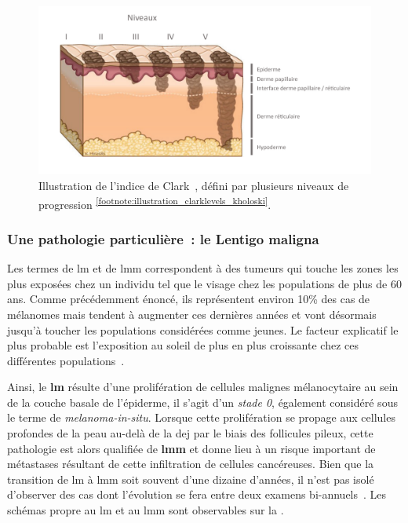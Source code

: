 \begin{figure}[H]
    \centering
    \includegraphics[width=0.9\linewidth]{contents/chapter_1/resources/illustration_clarklevels_kholoski.pdf}
    \caption{Illustration de l'indice de Clark~\cite{Clark1969}, défini par plusieurs niveaux de progression \textsuperscript{\ref{footnote:illustration_clarklevels_kholoski}}.}
    \label{fig:illustration_clarklevels_kholoski}
\end{figure}\par

\addtocounter{footnote}{1}

\subsubsection{Une pathologie particulière~: le Lentigo maligna}
\label{subsec:lentigo}
Les termes de \acrfull{lm} et de \acrfull{lmm} correspondent à des tumeurs qui touche les zones les plus exposées chez un individu tel que le visage chez les populations de plus de 60 ans. Comme précédemment énoncé, ils représentent environ 10\% des cas de mélanomes mais tendent à augmenter ces dernières années et vont désormais jusqu'à toucher les populations considérées comme jeunes. Le facteur explicatif le plus probable est l'exposition au soleil de plus en plus croissante chez ces différentes populations~\cite{Baccard2009, LeGal2011, LeDuff2014}.\par

Ainsi, le \textbf{\gls{lm}} résulte d'une prolifération de cellules malignes mélanocytaire au sein de la couche basale de l'épiderme, il s'agit d'un \textit{stade 0}, également considéré sous le terme de \textit{melanoma-in-situ}. Lorsque cette prolifération se propage aux cellules profondes de la peau au-delà de la \gls{dej} par le biais des follicules pileux, cette pathologie est alors qualifiée de \textbf{\gls{lmm}} et donne lieu à un risque important de métastases résultant de cette infiltration de cellules cancéreuses. Bien que la transition de \gls{lm} à \gls{lmm} soit souvent d'une dizaine d'années, il n'est pas isolé d'observer des cas dont l'évolution se fera entre deux examens bi-annuels~\cite{Mckenna2006, LeGal2011}. Les schémas propre au \gls{lm} et au \gls{lmm} sont observables sur la .\par

